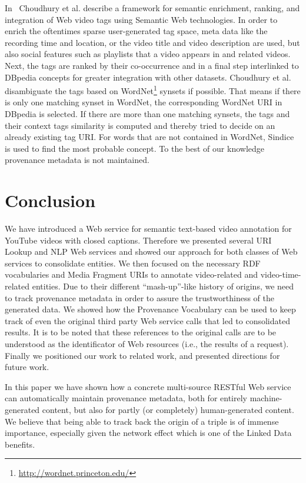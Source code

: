\documentclass{acm_proc_article-sp}
\begin{document}
In~\cite{Choudhury:YouTube} Choudhury et al. describe a framework for semantic enrichment, ranking, and integration of Web video tags using Semantic Web technologies. In order to enrich the oftentimes sparse user-generated tag space, meta data like the recording time and location, or the video title and video description are used, but also social features such as playlists that a video appears in and related videos. Next, the tags are ranked by their co-occurrence and in a final step interlinked to DBpedia concepts for greater integration with other datasets. Choudhury et al. disambiguate the tags based on WordNet\footnote{\url{http://wordnet.princeton.edu/}} synsets if possible. That means if there is only one matching synset in WordNet, the corresponding WordNet URI in DBpedia is selected. If there are more than one matching synsets, the tags and their context tags similarity is computed and thereby tried to decide on an already existing tag URI. For words that are not contained in WordNet, Sindice is used to find the most probable concept. To the best of our knowledge provenance metadata is not maintained.

\section{Conclusion}\label{sec:conclusion}
We have introduced a Web service for semantic text-based video annotation for YouTube videos with closed captions. Therefore we presented several URI Lookup and NLP Web services and showed our approach for both classes of Web services to consolidate entities. We then focused on the necessary RDF vocabularies and Media Fragment URIs to annotate video-related and video-time-related entities. Due to their different ``mash-up''-like history of origins, we need to track provenance metadata in order to assure the trustworthiness of the generated data. We showed how the Provenance Vocabulary can be used to keep track of even the original third party Web service calls that led to consolidated results. It is to be noted that these references to the original calls are to be understood as the identificator of Web resources (i.e., the results of a request). Finally we positioned our work to related work, and presented directions for future work.

In this paper we have shown how a concrete multi-source RESTful Web service can automatically maintain provenance metadata, both for entirely machine-generated content, but also for partly (or completely) human-generated content. We believe that being able to track back the origin of a triple is of immense importance, especially given the network effect which is one of the Linked Data benefits.
\end{document}
